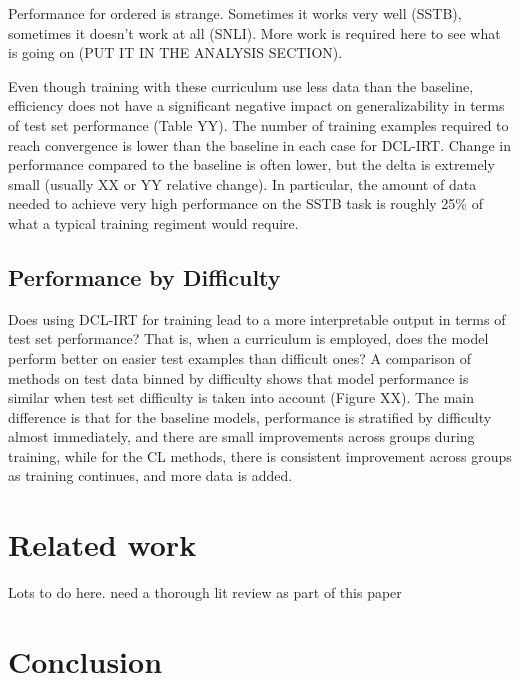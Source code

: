 \documentclass[letterpaper]{article} %
\begin{document}
Performance for ordered is strange.
Sometimes it works very well (SSTB), sometimes it doesn't work at all (SNLI).
More work is required here to see what is going on (PUT IT IN THE ANALYSIS SECTION).

Even though training with these curriculum use less data than the baseline, efficiency does not have a significant negative impact on generalizability in terms of test set performance (Table YY).
The number of training examples required to reach convergence is lower than the baseline in each case for DCL-IRT.
Change in performance compared to the baseline is often lower, but the delta is extremely small (usually XX or YY relative change). 
In particular, the amount of data needed to achieve very high performance on the SSTB task is roughly 25\% of what a typical training regiment would require.


\subsection{Performance by Difficulty}
Does using DCL-IRT for training lead to a more interpretable output in terms of test set performance?
That is, when a curriculum is employed, does the model perform better on easier test examples than difficult ones?
A comparison of methods on test data binned by difficulty shows that model performance is similar when test set difficulty is taken into account (Figure XX).
The main difference is that for the baseline models, performance is stratified by difficulty almost immediately, and there are small improvements across groups during training, while for the CL methods, there is consistent improvement across groups as training continues, and more data is added. 


\section{Related work}

Lots to do here. need a thorough lit review as part of this paper 

\section{Conclusion} 
\end{document}
